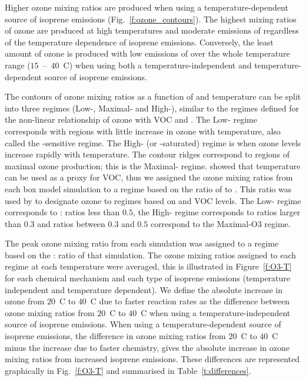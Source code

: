 Higher ozone mixing ratios are produced when using a temperature-dependent source of isoprene emissions (Fig.~\ref{f:ozone_contours}).
The highest mixing ratios of ozone are produced at high temperatures and moderate emissions of  regardless of the temperature dependence of isoprene emissions.
Conversely, the least amount of ozone is produced with low emissions of  over the whole temperature range ($15$~--~$40$~\degree C) when using both a temperature-independent and temperature-dependent source of isoprene emissions.

The contours of ozone mixing ratios as a function of  and temperature can be split into three  regimes (Low-, Maximal- and High-), similar to the  regimes defined for the non-linear relationship of ozone with VOC and .
The Low- regime corresponds with regions with little increase in ozone with temperature, also called the -sensitive regime.
The High- (or -saturated) regime is when ozone levels increase rapidly with temperature. 
The contour ridges correspond to regions of maximal ozone production; this is the Maximal- regime.
\citet{Pusede:2014} showed that temperature can be used as a proxy for VOC, thus we assigned the ozone mixing ratios from each box model simulation to a  regime based on the ratio of  to .
This ratio was used by \citet{Sillman:1995} to designate ozone to  regimes based on  and VOC levels. 
The Low- regime corresponds to : ratios less than $0.5$, the High- regime corresponds to ratios larger than $0.3$ and ratios between $0.3$ and $0.5$ correspond to the Maximal-O3 regime.

The peak ozone mixing ratio from each simulation was assigned to a  regime based on the : ratio of that simulation.
The ozone mixing ratios assigned to each  regime at each temperature were averaged, this is illustrated in Figure~\ref{f:O3-T} for each chemical mechanism and each type of isoprene emissions (temperature independent and temperature dependent).  
We define the absolute increase in ozone from $20$~\degree C to $40$~\degree C due to faster reaction rates as the difference between ozone mixing ratios from $20$~\degree C to $40$~\degree C when using a temperature-independent source of isoprene emissions.
When using a temperature-dependent source of isoprene emissions, the difference in ozone mixing ratios from $20$~\degree C to $40$~\degree C minus the increase due to faster chemistry, gives the absolute increase in ozone mixing ratios from increased isoprene emissions.
These differences are represented graphically in Fig.~\ref{f:O3-T} and summarised in Table~\ref{t:differences}.

